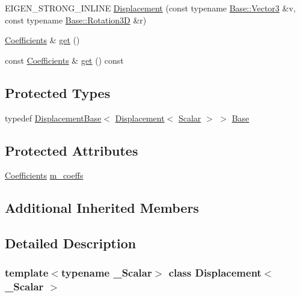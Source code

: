 \begin{DoxyCompactItemize}
\item 
E\+I\+G\+E\+N\+\_\+\+S\+T\+R\+O\+N\+G\+\_\+\+I\+N\+L\+I\+NE \hyperlink{class_displacement_a65ba493ec0968d840e37f5af1a407e0e}{Displacement} (const typename \hyperlink{class_displacement_base_a0b5e3b97de6478fd98bf6aec9730d4c4}{Base\+::\+Vector3} \&v, const typename \hyperlink{class_displacement_base_aca59ea9e7f5fb3b67a489726bced7f4f}{Base\+::\+Rotation3D} \&r)
\item 
\hyperlink{class_displacement_a995adefd20afdb476cdef2aa7bbc4531}{Coefficients} \& \hyperlink{class_displacement_ac1c0567d40677f692db03770ce80b214}{get} ()
\item 
const \hyperlink{class_displacement_a995adefd20afdb476cdef2aa7bbc4531}{Coefficients} \& \hyperlink{class_displacement_adc206e570d379e6082e0cb2c7c82a41f}{get} () const
\end{DoxyCompactItemize}
\subsection*{Protected Types}
\begin{DoxyCompactItemize}
\item 
typedef \hyperlink{class_displacement_base}{Displacement\+Base}$<$ \hyperlink{class_displacement}{Displacement}$<$ \hyperlink{class_displacement_ade979a89a65e3b67dea322a0cef92c88}{Scalar} $>$ $>$ \hyperlink{class_displacement_acdd707b0e59e9f846d6c116fc8c88408}{Base}
\end{DoxyCompactItemize}
\subsection*{Protected Attributes}
\begin{DoxyCompactItemize}
\item 
\hyperlink{class_displacement_a995adefd20afdb476cdef2aa7bbc4531}{Coefficients} \hyperlink{class_displacement_aa74b681eed8e46c0df5291f32e0d7445}{m\+\_\+coeffs}
\end{DoxyCompactItemize}
\subsection*{Additional Inherited Members}


\subsection{Detailed Description}
\subsubsection*{template$<$typename \+\_\+\+Scalar$>$\newline
class Displacement$<$ \+\_\+\+Scalar $>$}

